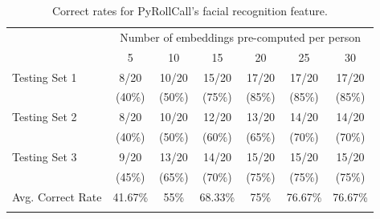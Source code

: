 \begin{table}[!htb]
\centering
\caption{Correct rates for PyRollCall's facial recognition feature.} 
\begin{tabular}{@{}lcccccc@{}}
\toprule[2pt]
& \multicolumn{6}{c}{Number of embeddings pre-computed per person}                                                                                                                              \\ \addlinespace[0.5em]
                  & 5                          & 10                         & 15                         & 20                         & 25                         & 30                         \\ \midrule \addlinespace[0.5em]
Testing Set 1     & 8/20                       & 10/20                      & 15/20                      & 17/20                      & 17/20                      & 17/20                      \\
                  & \multicolumn{1}{c}{(40\%)} & \multicolumn{1}{c}{(50\%)} & \multicolumn{1}{c}{(75\%)} & \multicolumn{1}{c}{(85\%)} & \multicolumn{1}{c}{(85\%)} & \multicolumn{1}{c}{(85\%)} \\ \addlinespace[0.5em] \midrule \addlinespace[0.5em]
Testing Set 2     & 8/20                       & 10/20                      & 12/20                      & 13/20                      & 14/20                      & 14/20                      \\
                  & \multicolumn{1}{c}{(40\%)} & \multicolumn{1}{c}{(50\%)} & \multicolumn{1}{c}{(60\%)} & \multicolumn{1}{c}{(65\%)} & \multicolumn{1}{c}{(70\%)} & \multicolumn{1}{c}{(70\%)} \\ \addlinespace[0.5em] \midrule \addlinespace[0.5em]
Testing Set 3     & 9/20                       & 13/20                      & 14/20                      & 15/20                      & 15/20                      & 15/20                      \\
                  & \multicolumn{1}{c}{(45\%)} & \multicolumn{1}{c}{(65\%)} & \multicolumn{1}{c}{(70\%)} & \multicolumn{1}{c}{(75\%)} & \multicolumn{1}{c}{(75\%)} & \multicolumn{1}{c}{(75\%)} \\ \addlinespace[0.5em] \midrule[2pt] \addlinespace[0.5em]
Avg. Correct Rate & 41.67\%                    & 55\%                       & 68.33\%                    & 75\%                       & 76.67\%                    & 76.67\%                    \\ \addlinespace[0.5em]
\bottomrule[2pt]
\end{tabular}
\label{tab:exp-result-tab}
\end{table}
\vspace{0.2cm}

